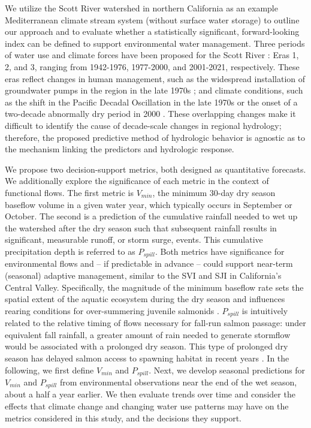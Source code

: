 \documentclass[hess, manuscript]{copernicus}
\begin{document}
We utilize the Scott River watershed in northern California as an
example Mediterranean climate stream system (without surface water
storage) to outline our approach and to evaluate whether a statistically
significant, forward-looking index can be defined to support
environmental water management. Three periods of water use and climate
forces have been proposed for the Scott River \citep[e.g.,
by][]{Pyschik2022}: Eras 1, 2, and 3, ranging from 1942-1976, 1977-2000,
and 2001-2021, respectively. These eras reflect changes in human
management, such as the widespread installation of groundwater pumps in
the region in the late 1970s \citep{Tolley2019}; and climate conditions,
such as the shift in the Pacific Decadal Oscillation in the late 1970s
\citep{Francis1998} or the onset of a two-decade abnormally dry period
in 2000 \citep{Williams2020}. These overlapping changes make it
difficult to identify the cause of decade-scale changes in regional
hydrology; therefore, the proposed predictive method of hydrologic
behavior is agnostic as to the mechanism linking the predictors and
hydrologic response.

We propose two decision-support metrics, both designed as quantitative
forecasts. We additionally explore the significance of each metric in
the context of functional flows. The first metric is \(V_{min}\), the
minimum 30-day dry season baseflow volume in a given water year, which
typically occurs in September or October. The second is a prediction of
the cumulative rainfall needed to wet up the watershed after the dry
season such that subsequent rainfall results in significant, measurable
runoff, or storm surge, events. This cumulative precipitation depth is
referred to as \(P_{spill}\). Both metrics have significance for
environmental flows and -- if predictable in advance -- could support
near-term (seasonal) adaptive management, similar to the SVI and SJI in
California's Central Valley. Specifically, the magnitude of the minimum
baseflow rate sets the spatial extent of the aquatic ecosystem during
the dry season and influences rearing conditions for over-summering
juvenile salmonids \citep{Gorman2016}. \(P_{spill}\) is intuitively
related to the relative timing of flows necessary for fall-run salmon
passage: under equivalent fall rainfall, a greater amount of rain needed
to generate stormflow would be associated with a prolonged dry season.
This type of prolonged dry season has delayed salmon access to spawning
habitat in recent years \citeyearpar[CDFW][]{CDFW2015a}. In the
following, we first define \(V_{min}\) and \(P_{spill}\). Next, we
develop seasonal predictions for \(V_{min}\) and \(P_{spill}\) from
environmental observations near the end of the wet season, about a half
a year earlier. We then evaluate trends over time and consider the
effects that climate change and changing water use patterns may have on
the metrics considered in this study, and the decisions they support.
\end{document}
